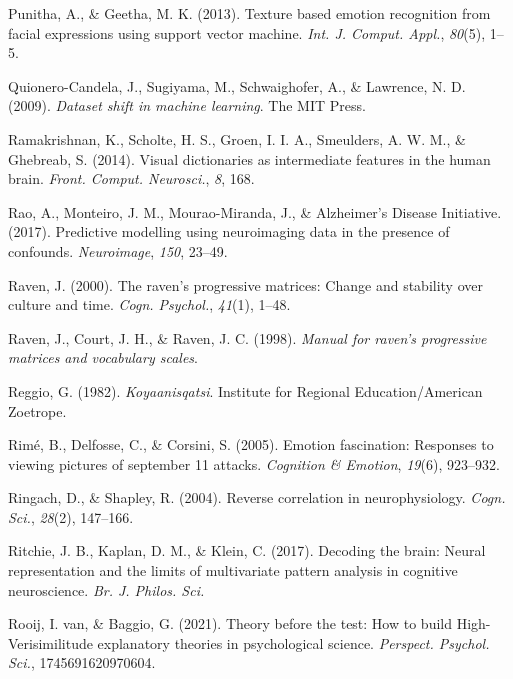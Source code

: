 \documentclass[11pt,american,]{memoir} %
\begin{document}
\leavevmode\hypertarget{ref-Punitha2013-jy}{}%
Punitha, A., \& Geetha, M. K. (2013). Texture based emotion recognition from facial expressions using support vector machine. \emph{Int. J. Comput. Appl.}, \emph{80}(5), 1--5.

\leavevmode\hypertarget{ref-Quionero-Candela2009-ge}{}%
Quionero-Candela, J., Sugiyama, M., Schwaighofer, A., \& Lawrence, N. D. (2009). \emph{Dataset shift in machine learning}. The MIT Press.

\leavevmode\hypertarget{ref-Ramakrishnan2014-ki}{}%
Ramakrishnan, K., Scholte, H. S., Groen, I. I. A., Smeulders, A. W. M., \& Ghebreab, S. (2014). Visual dictionaries as intermediate features in the human brain. \emph{Front. Comput. Neurosci.}, \emph{8}, 168.

\leavevmode\hypertarget{ref-Rao2017-bw}{}%
Rao, A., Monteiro, J. M., Mourao-Miranda, J., \& Alzheimer's Disease Initiative. (2017). Predictive modelling using neuroimaging data in the presence of confounds. \emph{Neuroimage}, \emph{150}, 23--49.

\leavevmode\hypertarget{ref-Raven2000-hs}{}%
Raven, J. (2000). The raven's progressive matrices: Change and stability over culture and time. \emph{Cogn. Psychol.}, \emph{41}(1), 1--48.

\leavevmode\hypertarget{ref-Raven1998-om}{}%
Raven, J., Court, J. H., \& Raven, J. C. (1998). \emph{Manual for raven's progressive matrices and vocabulary scales}.

\leavevmode\hypertarget{ref-Reggio1982-ex}{}%
Reggio, G. (1982). \emph{Koyaanisqatsi}. Institute for Regional Education/American Zoetrope.

\leavevmode\hypertarget{ref-rime2005brief}{}%
Rimé, B., Delfosse, C., \& Corsini, S. (2005). Emotion fascination: Responses to viewing pictures of september 11 attacks. \emph{Cognition \& Emotion}, \emph{19}(6), 923--932.

\leavevmode\hypertarget{ref-Ringach2004-nn}{}%
Ringach, D., \& Shapley, R. (2004). Reverse correlation in neurophysiology. \emph{Cogn. Sci.}, \emph{28}(2), 147--166.

\leavevmode\hypertarget{ref-Ritchie2017-gl}{}%
Ritchie, J. B., Kaplan, D. M., \& Klein, C. (2017). Decoding the brain: Neural representation and the limits of multivariate pattern analysis in cognitive neuroscience. \emph{Br. J. Philos. Sci.}

\leavevmode\hypertarget{ref-Van_Rooij2021-bk}{}%
Rooij, I. van, \& Baggio, G. (2021). Theory before the test: How to build High-Verisimilitude explanatory theories in psychological science. \emph{Perspect. Psychol. Sci.}, 1745691620970604.
\end{document}
